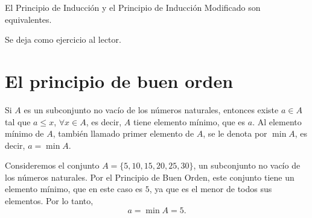 \begin{prop}{}{}
    El Principio de Inducción y el Principio de Inducción Modificado son equivalentes.

    \tcblower
    \demostracion Se deja como ejercicio al lector.
\end{prop}

\section{El principio de buen orden}

\begin{tcolorbox}[
    theorem style=change apart,
    enhanced,
    lower separated=false,
    breakable,
    boxrule=0pt,
    frame hidden,
    colback=black!7!white,
    coltitle=black,
    boxed title style={colframe=white, colback=white, boxrule=0pt},
    fontupper=\normalsize,
    before upper={\abovedisplayskip=8pt\belowdisplayskip=8pt},
    left=1mm,
    right=1mm,
    top=1mm,
    bottom=1mm,
    sharp corners,
    overlay={
        \node[left, font=\bfseries\color{black}\fontencoding{T1}\fontfamily{phv}\selectfont,minimum width=2cm, anchor=east, xshift=-0.5\marginparsep, yshift=-0.348cm] at (frame.north west) {Principio de Buen Orden:};
    }
]
    Si $A$ es un subconjunto no vacío de los números naturales, entonces existe $a \in A$ tal que $a \leq x$, $\forall x \in A$, es decir, $A$ tiene elemento mínimo, que es $a$. Al elemento mínimo de $A$, también llamado primer elemento de $A$, se le denota por $\min A$, es decir, $a = \min A$.
\end{tcolorbox}

\begin{examplebox}{}{}
    Consideremos el conjunto $A = \{5, 10, 15, 20, 25, 30\}$, un subconjunto no vacío de los números naturales. Por el Principio de Buen Orden, este conjunto tiene un elemento mínimo, que en este caso es $5$, ya que es el menor de todos sus elementos. Por lo tanto,
    $$a = \min A = 5.$$
\end{examplebox}

